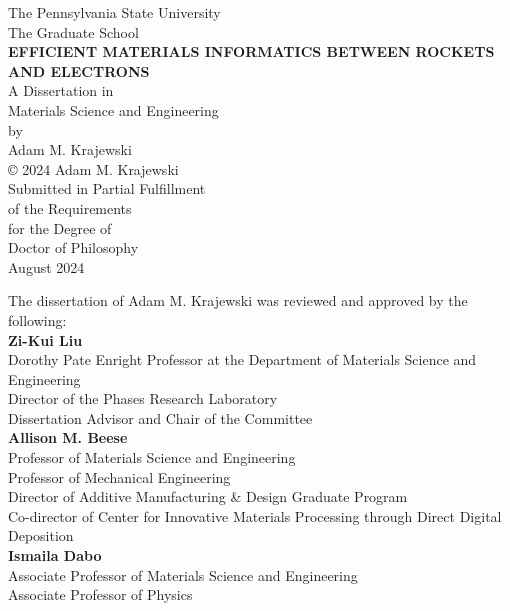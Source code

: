 \documentclass[letterpaper, 12pt]{report}
\begin{document}
\thispagestyle{empty}

{
\centering
The Pennsylvania State University\\
The Graduate School\\
\vfill
{}
{
\Large
\textbf{EFFICIENT MATERIALS INFORMATICS BETWEEN ROCKETS AND ELECTRONS}\\
}
\vfill
A Dissertation in\\
Materials Science and Engineering\\
by\\
Adam M. Krajewski\\
\vfill
© 2024 Adam M. Krajewski\\
\vfill
Submitted in Partial Fulfillment\\
of the Requirements\\
for the Degree of\\

\vfill
Doctor of Philosophy\\
\vfill
August 2024\\
\vfill
}

\newpage
{}
\setlength\parindent{0pt} %

The dissertation of Adam M. Krajewski was reviewed and approved by the following:\\

\textbf{Zi-Kui Liu}\\
Dorothy Pate Enright Professor at the Department of Materials Science and Engineering\\
Director of the Phases Research Laboratory\\
Dissertation Advisor and Chair of the Committee\\

\textbf{Allison M. Beese}\\
Professor of Materials Science and Engineering\\
Professor of Mechanical Engineering\\
Director of Additive Manufacturing \& Design Graduate Program\\
Co-director of Center for Innovative Materials Processing through Direct Digital Deposition\\

\textbf{Ismaila Dabo}\\
Associate Professor of Materials Science and Engineering\\
Associate Professor of Physics\\
\end{document}
